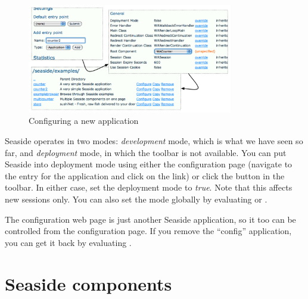 \documentclass[a4paper,10pt,twoside]{book}
\begin{document}
\begin{figure}[ht]
\begin{center}
\includegraphics[width=0.8\textwidth]{counter2}
\caption{Configuring a new application}
\label{fig:counter2}
\end{center}
\end{figure}

Seaside operates in two modes: \emph{development} mode, which is what we have seen so far, and \emph{deployment} mode, in which the toolbar is not available.
You can put Seaside into deployment mode using either the configuration page (navigate to the entry for the application and click on the  link)
or click the  button in the toolbar.
In either case, set the deployment mode to \emph{true}.
Note that this affects new sessions only.
You can also set the mode globally by evaluating
 
or
.

The configuration web page is just another Seaside application, so it too can be controlled from the configuration page.
If you remove the ``config'' application, you can get it back by evaluating
 .

\section{Seaside components}
\label{sec:components}

\end{document}
